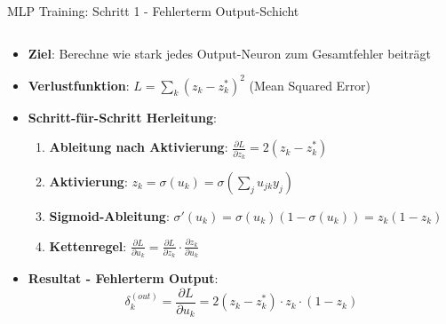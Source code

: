 \documentclass[aspectratio=1610, xcolor=dvipsnames, 9pt]{beamer}
\begin{document}
      \begin{frame}{MLP Training: Schritt 1 - Fehlerterm Output-Schicht}
        \begin{columns}
          \begin{column}{1\textwidth}
            \begin{itemize}
              \item \textbf{Ziel}: Berechne wie stark jedes Output-Neuron zum Gesamtfehler beiträgt
              \item \textbf{Verlustfunktion}: $L = \sum_k (z_k - z_k^*)^2$ (Mean Squared Error)
              \item \textbf{Schritt-für-Schritt Herleitung}:
              \begin{enumerate}
                \item \textbf{Ableitung nach Aktivierung}: $\frac{\partial L}{\partial z_k} = 2(z_k - z_k^*)$
                \item \textbf{Aktivierung}: $z_k = \sigma(u_k) = \sigma(\sum_j u_{jk} y_j)$
                \item \textbf{Sigmoid-Ableitung}: $\sigma'(u_k) = \sigma(u_k)(1-\sigma(u_k)) = z_k(1-z_k)$
                \item \textbf{Kettenregel}: $\frac{\partial L}{\partial u_k} = \frac{\partial L}{\partial z_k} \cdot \frac{\partial z_k}{\partial u_k}$
              \end{enumerate}
              \item \textbf{Resultat - Fehlerterm Output}:
              \begin{equation}
                \delta_k^{(out)} = \frac{\partial L}{\partial u_k} = 2(z_k - z_k^*) \cdot z_k \cdot (1 - z_k)
              \end{equation}
            \end{itemize}
          \end{column}
        \end{columns}
      \end{frame}
\end{document}
